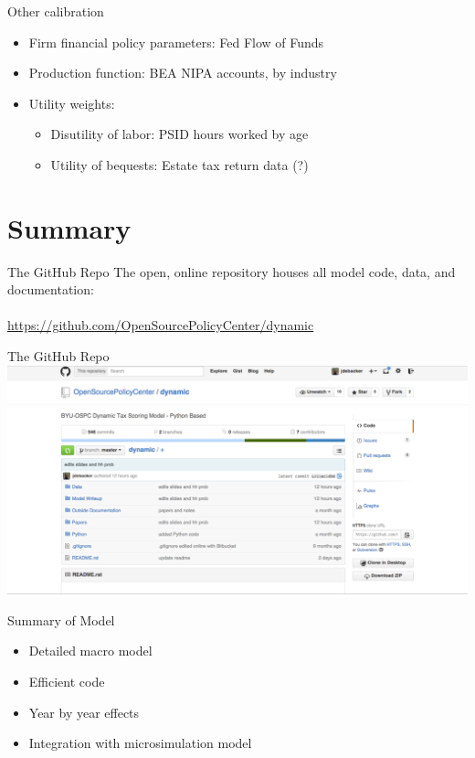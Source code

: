 \documentclass{beamer}
\begin{document}
\begin{frame}{Other calibration}
\begin{itemize}
\item Firm financial policy parameters: Fed Flow of Funds
\item Production function: BEA NIPA accounts, by industry 
\item Utility weights:
	\begin{itemize}
	\item Disutility of labor: PSID hours worked by age
	\item Utility of bequests: Estate tax return data (?)
	\end{itemize}
\end{itemize}
\end{frame}

\section{Summary}

  \begin{frame}{The GitHub Repo}
  The open, online repository houses all model code, data, and documentation: \\
  \ \\
\href{https://github.com/OpenSourcePolicyCenter/dynamic}{https://github.com/OpenSourcePolicyCenter/dynamic}
  \end{frame}
  
  
    \begin{frame}{The GitHub Repo}
  \includegraphics[scale=.25]{images/GitHub_mainscreen.pdf}
  \end{frame}

  \begin{frame}{Summary of Model}
  \begin{itemize}
      \item Detailed macro model
      \item Efficient code
      \item Year by year effects
      \item Integration with microsimulation model
  \end{itemize}
  \end{frame}
  
\end{document}
